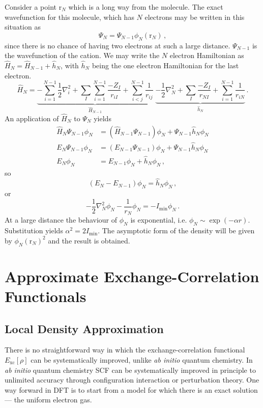\documentclass{article}
\theoremstyle{plain}\theoremheaderfont{\normalfont\itshape}\theorembodyfont{\rmfamily}\theoremseparator{.}\newtheorem*{rem}{Remark}\newtheorem*{ex}{Example}\newtheorem*{proof}{Proof}\newtheorem*{altp}{Alternative proof}
\theoremstyle{plain}\theoremheaderfont{\normalfont\bfseries}\theorembodyfont{\rmfamily}\theoremseparator{.}\newtheorem{thm}{Theorem}[section]\newtheorem{lem}[thm]{Lemma}\newtheorem{prop}[thm]{Proposition}\newtheorem*{cor}{Corollary}\newtheorem{defn}[thm]{Definition}\newtheorem{clm}[thm]{Claim}\newtheorem{clminproof}{Claim}
\theoremstyle{break}\theoremheaderfont{\normalfont\itshape}\theorembodyfont{\rmfamily}\theoremseparator{.\medskip}\newtheorem*{proofskip}{Proof}\newtheorem*{exs}{Examples}\newtheorem*{rems}{Remarks}
\theoremstyle{break}\theoremheaderfont{\normalfont\bfseries}\theorembodyfont{\rmfamily}\theoremseparator{.\medskip}\newtheorem{lemskip}[thm]{Lemma}\newtheorem{defnskip}[thm]{Definition}\newtheorem{propskip}[thm]{Proposition}\newtheorem{thmskip}[thm]{Theorem}
\numberwithin{equation}{section}
\newcommand{\vb}[1]{\bm{\mathrm{#1}}}
\newcommand{\laplacian}{\nabla^2}
\newcommand{\xc}{_{\text{xc}}}
\begin{document}
    Consider a point \(\vb{r}_N\) which is a long way from the molecule. The exact wavefunction for this molecule, which has \(N\) electrons may be written in this situation as
    \begin{equation}
        \Psi_N=\Psi_{N-1}\phi_N(\vb{r}_N)\,,
    \end{equation}
    since there is no chance of having two electrons at such a large distance. \(\Psi_{N-1}\) is the wavefunction of the cation. We may write the \(N\) electron Hamiltonian as \(\hat{H}_N=\hat{H}_{N-1}+\hat{h}_N\), with \(\hat{h}_N\) being the one electron Hamiltonian for the last electron.
    \begin{equation}
        \hat{H}_N=\underbrace{-\sum_{i=1}^{N-1}\frac{1}{2}\laplacian_i+\sum_I\sum_{i=1}^{N-1}\frac{-Z_I}{r_{iI}}+\sum_{i<j}^{N-1}\frac{1}{r_{ij}}}_{\hat{H}_{N-1}}\;\underbrace{-\frac{1}{2}\laplacian_N+\sum_I\frac{-Z_I}{r_{NI}}+\sum_{i=1}^{N-1}\frac{1}{r_{iN}}}_{\hat{h}_{N}}\,.
    \end{equation}
    An application of \(\hat{H}_N\) to \(\Psi_N\) yields
    \begin{align}
        \hat{H}_N\Psi_{N-1}\phi_N&=(\hat{H}_{N-1}\Psi_{N-1})\phi_N+\Psi_{N-1}\hat{h}_N\phi_N\\
        E_N\Psi_{N-1}\phi_N&=(E_{N-1}\Psi_{N-1})\phi_N+\Psi_{N-1}\hat{h}_N\phi_N\\
        E_N\phi_N&=E_{N-1}\phi_N+\hat{h}_N\phi_N\,,
    \end{align}
    so
    \begin{equation}
        (E_N-E_{N-1})\phi_N=\hat{h}_N\phi_N\,,
    \end{equation}
    or
    \begin{equation}
        -\frac{1}{2}\laplacian_N\phi_N-\frac{1}{r_N}\phi_N=-I_{\text{min}}\phi_N\,.
    \end{equation}
    At a large distance the behaviour of \(\phi_N\) is exponential, i.e. \(\phi_N\sim\exp(-\alpha r)\). Substitution yields \(\alpha^2=2I_{\text{min}}\). The asymptotic form of the density will be given by \(\phi_N(\vb{r}_N)^2\) and the result is obtained.

    \newpage
    \section{Approximate Exchange-Correlation Functionals}
    \subsection{Local Density Approximation}
    There is no straightforward way in which the exchange-correlation functional \(E\xc[\rho]\) can be systematically improved, unlike \textit{ab initio} quantum chemistry. In \textit{ab initio} quantum chemistry SCF can be systematically improved in principle to unlimited accuracy through configuration interaction or perturbation theory. One way forward in DFT is to start from a model for which there is an exact solution --- the uniform electron gas.
\end{document}

